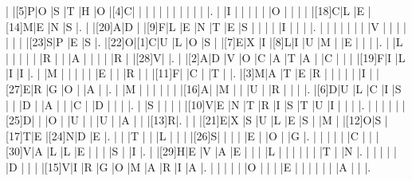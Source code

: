 \documentclass[12pt]{article}
\begin{document}
\begin{Puzzle}{20}{20}
  |{}  |[5]P|O   |S   |T   |H   |O   |[4]C|{}  |{}  |{}  |{}  |{}  |{}  |{}  |{}  |{}  |{}  |{}  |.
  |{}  |I   |{}  |{}  |{}  |{}  |{}  |O   |{}  |{}  |{}  |{}  |[18]C|L   |E   |[14]M|E   |N   |S   |.
  |{}  |[20]A|D   |{}  |[9]F|L   |E   |N   |T   |E   |S   |{}  |{}  |{}  |{}  |I   |{}  |{}  |{}  |.
  |{}  |{}  |{}  |{}  |{}  |{}  |{}  |V   |{}  |{}  |{}  |{}  |{}  |{}  |{}  |[23]S|P   |E   |S   |.
  |[22]O|[1]C|U   |L   |O   |S   |{}  |[7]E|X   |I   |[8]L|I   |U   |M   |{}  |E   |{}  |{}  |{}  |.
  |{}  |L   |{}  |{}  |{}  |{}  |{}  |R   |{}  |{}  |A   |{}  |{}  |{}  |{}  |R   |{}  |[28]V|{}  |.
  |{}  |[2]A|D   |V   |O   |C   |A   |T   |A   |{}  |C   |{}  |{}  |{}  |[19]F|I   |L   |I   |I   |.
  |{}  |M   |{}  |{}  |{}  |{}  |{}  |E   |{}  |{}  |R   |{}  |{}  |[11]F|{}  |C   |{}  |T   |{}  |.
  |[3]M|A   |T   |E   |R   |{}  |{}  |{}  |{}  |{}  |I   |{}  |[27]E|R   |G   |O   |{}  |A   |{}  |.
  |{}  |M   |{}  |{}  |{}  |{}  |{}  |{}  |[16]A|{}  |M   |{}  |{}  |U   |{}  |R   |{}  |{}  |{}  |.
  |[6]D|U   |L   |C   |I   |S   |{}  |{}  |D   |{}  |A   |{}  |{}  |C   |{}  |D   |{}  |{}  |{}  |.
  |{}  |S   |{}  |{}  |{}  |{}  |[10]V|E   |N   |T   |R   |I   |S   |T   |U   |I   |{}  |{}  |{}  |.
  |{}  |{}  |{}  |{}  |{}  |[25]D|{}  |{}  |O   |{}  |U   |{}  |{}  |U   |{}  |A   |{}  |{}  |[13]R|.
  |{}  |{}  |[21]E|X   |S   |U   |L   |E   |S   |{}  |M   |{}  |[12]O|S   |[17]T|E   |[24]N|D   |E   |.
  |{}  |{}  |T   |{}  |{}  |L   |{}  |{}  |{}  |[26]S|{}  |{}  |{}  |{}  |E   |{}  |O   |{}  |G   |.
  |{}  |{}  |{}  |{}  |{}  |C   |{}  |{}  |[30]V|A   |L   |L   |E   |{}  |{}  |{}  |S   |{}  |I   |.
  |{}  |[29]H|E   |V   |A   |E   |{}  |{}  |{}  |L   |{}  |{}  |{}  |{}  |{}  |{}  |T   |{}  |N   |.
  |{}  |{}  |{}  |{}  |{}  |D   |{}  |{}  |{}  |[15]V|I   |R   |G   |O   |M   |A   |R   |I   |A   |.
  |{}  |{}  |{}  |{}  |{}  |O   |{}  |{}  |{}  |E   |{}  |{}  |{}  |{}  |{}  |{}  |A   |{}  |{}  |.
\end{Puzzle}
\end{document}
